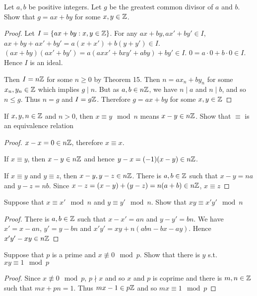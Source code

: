 \documentclass[11pt]{article}
\begin{document}
\begin{exercise}
Let \(a,b\) be positive integers. Let \(g\) be the greatest common divisor of \(a\) and \(b\). Show
that \(g=ax+by\) for some \(x,y\in\mathbb{Z}\).
\end{exercise}

\begin{proof}
Let \(I=\{ax+by:x,y\in\mathbb{Z}\}\). For
any \(ax+by,ax'+by'\in I\), \(ax+by+ax'+by'=a(x+x')+b(y+y')\in I\).
\((ax+by)(ax'+by')=a(axx'+bxy'+aby)+by'\in I\).
\(0=a\cdot 0+b\cdot 0\in I\). Hence \(I\) is an ideal.

Then \(I=n\mathbb{Z}\) for some \(n\ge 0\) by Theorem 15. Then \(n=ax_n+by_n\) for some \(x_n,y_n\in\mathbb{Z}\) which
implies \(g\mid n\). But as \(a,b\in n\mathbb{Z}\), we have \(n\mid a\) and \(n\mid b\), and so \(n\le g\). Thus \(n=g\)
and \(I=g\mathbb{Z}\). Therefore \(g=ax+by\) for some \(x,y\in\mathbb{Z}\)
\end{proof}

\begin{exercise}
If \(x,y,n\in\mathbb{Z}\) and \(n>0\), then \(x\equiv y\mod n\) means \(x-y\in n\mathbb{Z}\). Show that \(\equiv\) is an equivalence relation
\end{exercise}

\begin{proof}
\(x-x=0\in n\mathbb{Z}\), therefore \(x\equiv x\).

If \(x\equiv y\), then \(x-y\in n\mathbb{Z}\) and hence \(y-x=(-1)(x-y)\in n\mathbb{Z}\).

If \(x\equiv y\) and \(y\equiv z\), then \(x-y,y-z\in n\mathbb{Z}\). There is \(a,b\in \mathbb{Z}\) such that \(x-y=na\)
and \(y-z=nb\). Since \(x-z=(x-y)+(y-z)=n(a+b)\in n\mathbb{Z}\), \(x\equiv z\)
\end{proof}

\begin{exercise}
Suppose that \(x\equiv x'\mod n\) and \(y\equiv y'\mod n\). Show that \(xy\equiv x'y'\mod n\)
\end{exercise}

\begin{proof}
There is \(a,b\in\mathbb{Z}\) such that \(x-x'=an\) and \(y-y'=bn\). We have \(x'=x-an\), \(y'=y-bn\)
and \(x'y'=xy+n(abn-bx-ay)\). Hence \(x'y'-xy\in n\mathbb{Z}\)
\end{proof}

\begin{exercise}
Suppose that \(p\) is a prime and \(x\not\equiv 0\mod p\). Show that there is \(y\) s.t. \(xy\equiv 1\mod p\)
\end{exercise}

\begin{proof}
Since \(x\not\equiv 0\mod p\), \(p\nmid x\) and so \(x\) and \(p\) is coprime and there is \(m,n\in\mathbb{Z}\) such
that \(mx+pn=1\). Thus \(mx-1\in p\mathbb{Z}\) and so \(mx\equiv 1\mod p\)
\end{proof}
\end{document}
